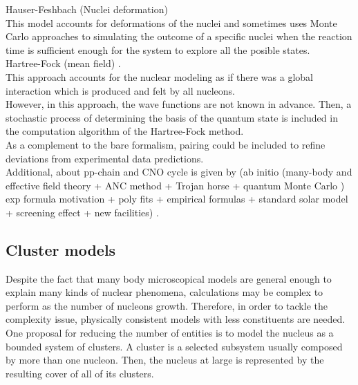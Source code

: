 \documentclass[openany]{book}
\begin{document}
Hauser-Feshbach (Nuclei deformation) \cite{jayatissa_avila_rehm_talwar_mohr_auranen_chen_gorelov_hoffman_jiang_et_2022} \\

This model accounts for deformations of the nuclei and sometimes uses Monte Carlo approaches to simulating the outcome of a specific nuclei when the reaction time is sufficient enough for the system to explore all the posible states. \\

Hartree-Fock (mean field) \cite{leanh_minhloc_2022}. \\ 

This approach accounts for the nuclear modeling as if there was a global interaction which is produced and felt by all nucleons. \\

However, in this approach, the wave functions are not known in advance. Then, a stochastic process of determining the basis of the quantum state is included in the computation algorithm of the Hartree-Fock method. \\

As a complement to the bare formalism, pairing could be included to refine deviations from experimental data predictions. \\

Additional, about pp-chain and CNO cycle  is given by (ab initio (many-body and effective field theory + ANC method + Trojan horse + quantum Monte Carlo ) exp formula motivation + poly fits + empirical formulas +   standard solar model + screening effect + new facilities) \cite{adelberger_garcia_robertson_snover_balantekin_heeger_ramsey-musolf_bemmerer_junghans_bertulani_et_2011}.



\subsection{Cluster models} \label{sub:microscopical_cluster}

Despite the fact that many body microscopical models are general enough to explain many kinds of nuclear phenomena, calculations may be complex to perform as the number of nucleons growth. Therefore, in order to tackle the complexity issue, physically consistent models with less constituents are needed. \\

One proposal for reducing the number of entities is to model the nucleus as a bounded system of clusters. A cluster is a selected subsystem usually composed by more than one nucleon. Then, the nucleus at large is represented by the resulting cover of all of its clusters.   \\
\end{document}
